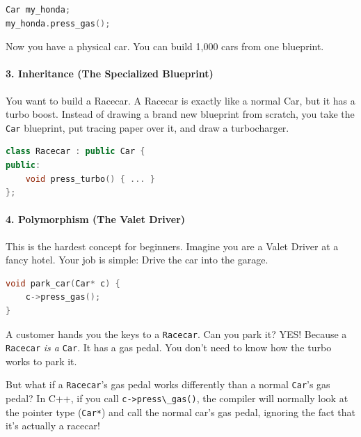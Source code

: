 \begin{lstlisting}[language={C++}]
Car my_honda;
my_honda.press_gas();
\end{lstlisting}

Now you have a physical car. You can build 1,000 cars from one
blueprint.

\hypertarget{inheritance-the-specialized-blueprint}{%
\paragraph{3. Inheritance (The Specialized
Blueprint)}\label{inheritance-the-specialized-blueprint}}

You want to build a Racecar. A Racecar is exactly like a normal Car, but
it has a turbo boost. Instead of drawing a brand new blueprint from
scratch, you take the \passthrough{\lstinline!Car!} blueprint, put
tracing paper over it, and draw a turbocharger.

\begin{lstlisting}[language={C++}]
class Racecar : public Car {
public:
    void press_turbo() { ... }
};
\end{lstlisting}

\hypertarget{polymorphism-the-valet-driver}{%
\paragraph{4. Polymorphism (The Valet
Driver)}\label{polymorphism-the-valet-driver}}

This is the hardest concept for beginners. Imagine you are a Valet
Driver at a fancy hotel. Your job is simple: Drive the car into the
garage.

\begin{lstlisting}[language={C++}]
void park_car(Car* c) {
    c->press_gas();
}
\end{lstlisting}

A customer hands you the keys to a \passthrough{\lstinline!Racecar!}.
Can you park it? YES! Because a \passthrough{\lstinline!Racecar!}
\emph{is a} \passthrough{\lstinline!Car!}. It has a gas pedal. You don't
need to know how the turbo works to park it.

But what if a \passthrough{\lstinline!Racecar!}'s gas pedal works
differently than a normal \passthrough{\lstinline!Car!}'s gas pedal? In
C++, if you call \passthrough{\lstinline!c->press\_gas()!}, the compiler
will normally look at the pointer type (\passthrough{\lstinline!Car*!})
and call the normal car's gas pedal, ignoring the fact that it's
actually a racecar!

